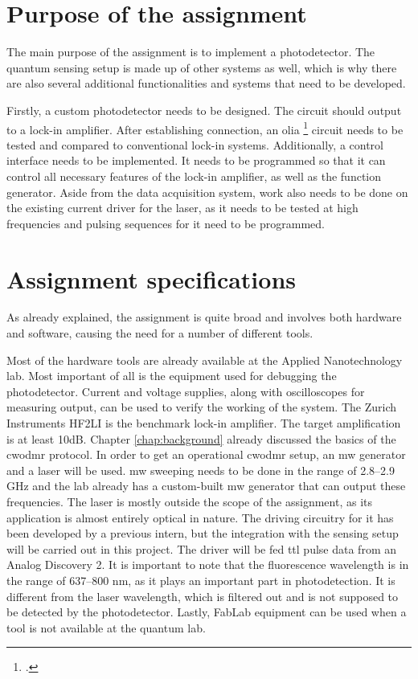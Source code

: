 \section{Purpose of the assignment}\label{purpose}
The main purpose of the assignment is to implement a photodetector. The quantum sensing setup is made up of other systems as well, which is why there are also several additional functionalities and systems that need to be developed. 


Firstly, a custom photodetector needs to be designed. The circuit should output to a lock-in amplifier. After establishing connection, an \gls{olia} \footcite[\gls{olia} is an open-source microcontroller-based lock-in amplifier. It uses common components, which makes it easy to build]{harvie2023olia} circuit needs to be tested and compared to conventional lock-in systems. Additionally, a control interface needs to be implemented. It needs to be programmed so that it can control all necessary features of the lock-in amplifier, as well as the function generator. Aside from the data acquisition system, work also needs to be done on the existing current driver for the laser, as it needs to be tested at high frequencies and pulsing sequences for it need to be programmed.


\section{Assignment specifications}\label{specifications}
As already explained, the assignment is quite broad and involves both hardware and software, causing the need for a number of different tools. 

Most of the hardware tools are already available at the Applied Nanotechnology lab. Most important of all is the equipment used for debugging the photodetector. Current and voltage supplies, along with oscilloscopes for measuring output, can be used to verify the working of the system. The Zurich Instruments HF2LI is the benchmark lock-in amplifier. The target amplification is at least 10dB. Chapter \ref{chap:background} already discussed the basics of the \gls{cwodmr} protocol. In order to get an operational \gls{cwodmr} setup, an \gls{mw} generator and a laser will be used. \gls{mw} sweeping needs to be done in the range of \numrange{2,8}{2,9} \unit{\giga\hertz} and the lab already has a custom-built \gls{mw} generator that can output these frequencies. The laser is mostly outside the scope of the assignment, as its application is almost entirely optical in nature. The driving circuitry for it has been developed by a previous intern, but the integration with the sensing setup will be carried out in this project. The driver will be fed \gls{ttl} pulse data from an Analog Discovery 2. It is important to note that the fluorescence wavelength is in the range of \numrange{637}{800} \unit{\nano\meter}, as it plays an important part in photodetection. It is different from the laser wavelength, which is filtered out and is not supposed to be detected by the photodetector. Lastly, FabLab equipment can be used when a tool is not available at the quantum lab. 
	
